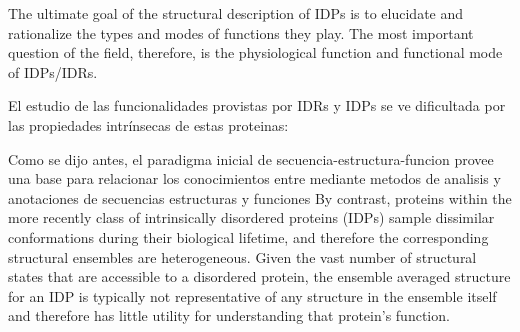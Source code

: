 % 
% 
% 
% 








The ultimate goal of the structural description of IDPs is to elucidate and rationalize the types and modes of functions they play.
The most important question of the field, therefore, is the physiological function and functional mode of IDPs/IDRs.


El estudio de las funcionalidades provistas por IDRs y IDPs se ve dificultada por las propiedades intrínsecas de estas proteinas:

Como se dijo antes, el paradigma inicial de secuencia-estructura-funcion provee una base para relacionar los conocimientos entre mediante metodos de analisis y anotaciones de secuencias estructuras y funciones 
By contrast, proteins within the more recently class of intrinsically disordered proteins (IDPs) sample dissimilar conformations during their biological lifetime, and therefore the corresponding structural
ensembles are heterogeneous. Given the vast number of structural states that are accessible to a disordered protein, the ensemble averaged structure for an IDP is typically not representative of any structure in 
the ensemble itself and therefore has little utility for understanding that protein's function.

